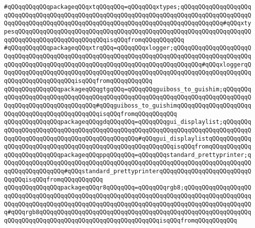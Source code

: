 \verb|#qQQqqQQqqQQqpackageqQQqxtqQQqqQQq=qQQqqQQqxtypes;qQQqqQQqqQQqqQQqqQQqqQQqqQQqqQQqqQQqqQQqqQQqqQQqqQQqqQQqqQQqqQQqqQQqqQQqqQQqqQQqqQQqqQQqqQQqqQQqqQQqqQQqqQQqqQQqqQQqqQQqqQQqqQQqqQQqqQQqqQQqqQQqqQQqqQQq#qQQqxtypesqQQqqQQqqQQqqQQqqQQqqQQqqQQqqQQqqQQqqQQqqQQqqQQqqQQqqQQqqQQqqQQqqQQqqQQqqQQqqQQqqQQqqQQqqQQqqQQqisqQQqfromqQQqqQQqqQQq|\newline
\verb|#qQQqqQQqqQQqpackageqQQqxtrqQQq=qQQqqQQqxlogger;qQQqqQQqqQQqqQQqqQQqqQQqqQQqqQQqqQQqqQQqqQQqqQQqqQQqqQQqqQQqqQQqqQQqqQQqqQQqqQQqqQQqqQQqqQQqqQQqqQQqqQQqqQQqqQQqqQQqqQQqqQQqqQQqqQQqqQQqqQQqqQQqqQQq#qQQqxloggerqQQqqQQqqQQqqQQqqQQqqQQqqQQqqQQqqQQqqQQqqQQqqQQqqQQqqQQqqQQqqQQqqQQqqQQqqQQqqQQqqQQqqQQqqQQqisqQQqfromqQQqqQQqqQQq|\newline
\newline
\verb|qQQqqQQqqQQqqQQqpackageqQQqgtgqQQq=qQQqqQQqguiboss_to_guishim;qQQqqQQqqQQqqQQqqQQqqQQqqQQqqQQqqQQqqQQqqQQqqQQqqQQqqQQqqQQqqQQqqQQqqQQqqQQqqQQqqQQqqQQqqQQqqQQqqQQqqQQq#qQQqguiboss_to_guishimqQQqqQQqqQQqqQQqqQQqqQQqqQQqqQQqqQQqqQQqqQQqqQQqisqQQqfromqQQqqQQqqQQq|\newline
\newline
\verb|qQQqqQQqqQQqqQQqpackageqQQqgdqQQqqQQq=qQQqqQQqgui_displaylist;qQQqqQQqqQQqqQQqqQQqqQQqqQQqqQQqqQQqqQQqqQQqqQQqqQQqqQQqqQQqqQQqqQQqqQQqqQQqqQQqqQQqqQQqqQQqqQQqqQQqqQQqqQQqqQQqqQQq#qQQqgui_displaylistqQQqqQQqqQQqqQQqqQQqqQQqqQQqqQQqqQQqqQQqqQQqqQQqqQQqqQQqqQQqisqQQqfromqQQqqQQqqQQq|\newline
\newline
\verb|qQQqqQQqqQQqqQQqpackageqQQqppqQQqqQQq=qQQqqQQqstandard_prettyprinter;qQQqqQQqqQQqqQQqqQQqqQQqqQQqqQQqqQQqqQQqqQQqqQQqqQQqqQQqqQQqqQQqqQQqqQQqqQQqqQQqqQQqqQQq#qQQqstandard_prettyprinterqQQqqQQqqQQqqQQqqQQqqQQqqQQqqQQqisqQQqfromqQQqqQQqqQQq|\newline
\verb|qQQqqQQqqQQqqQQqpackageqQQqr8qQQqqQQq=qQQqqQQqrgb8;qQQqqQQqqQQqqQQqqQQqqQQqqQQqqQQqqQQqqQQqqQQqqQQqqQQqqQQqqQQqqQQqqQQqqQQqqQQqqQQqqQQqqQQqqQQqqQQqqQQqqQQqqQQqqQQqqQQqqQQqqQQqqQQqqQQqqQQqqQQqqQQqqQQqqQQqqQQqqQQq#qQQqrgb8qQQqqQQqqQQqqQQqqQQqqQQqqQQqqQQqqQQqqQQqqQQqqQQqqQQqqQQqqQQqqQQqqQQqqQQqqQQqqQQqqQQqqQQqqQQqqQQqqQQqqQQqisqQQqfromqQQqqQQqqQQq|\newline
